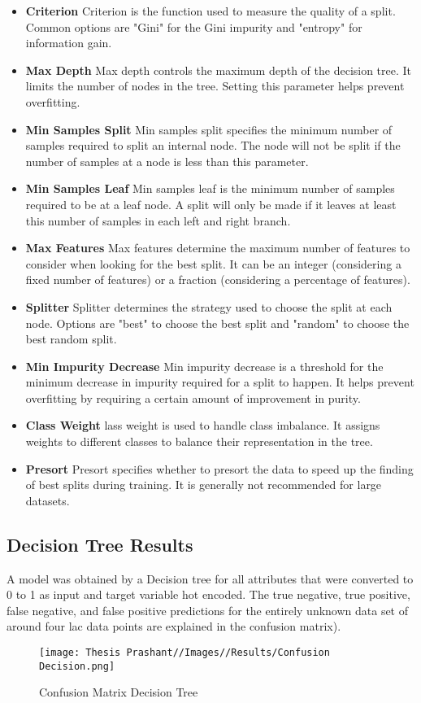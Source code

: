     \begin{itemize}
        \item \textbf{Criterion} Criterion is the function used to measure the quality of a split. Common options are "Gini" for the Gini impurity and "entropy" for information gain.
        \item \textbf{Max Depth} Max depth controls the maximum depth of the decision tree. It limits the number of nodes in the tree. Setting this parameter helps prevent overfitting.
        \item \textbf{Min Samples Split} Min samples split specifies the minimum number of samples required to split an internal node. The node will not be split if the number of samples at a node is less than this parameter.
        \item \textbf{Min Samples Leaf} Min samples leaf is the minimum number of samples required to be at a leaf node. A split will only be made if it leaves at least this number of samples in each left and right branch.
        \item \textbf{Max Features} Max features determine the maximum number of features to consider when looking for the best split. It can be an integer (considering a fixed number of features) or a fraction (considering a percentage of features).
        \item \textbf{Splitter} Splitter determines the strategy used to choose the split at each node. Options are "best" to choose the best split and "random" to choose the best random split.
        \item \textbf{Min Impurity Decrease} Min impurity decrease is a threshold for the minimum decrease in impurity required for a split to happen. It helps prevent overfitting by requiring a certain amount of improvement in purity.
        \item \textbf{Class Weight} lass weight is used to handle class imbalance. It assigns weights to different classes to balance their representation in the tree.
        \item \textbf{Presort} Presort specifies whether to presort the data to speed up the finding of best splits during training. It is generally not recommended for large datasets.
    \end{itemize}

\subsection{Decision Tree Results}
A model was obtained by a Decision tree for all attributes that were converted to 0 to 1 as input and target variable hot encoded. The true negative, true positive, false negative, and false positive predictions for the entirely unknown data set of around four lac data points are explained in the confusion matrix).
\begin{figure}
    \centering
    \texttt{[image: Thesis Prashant//Images//Results/Confusion Decision.png]}
    \caption{Confusion Matrix Decision Tree}
    \label{fig:enter-label}
\end{figure}

